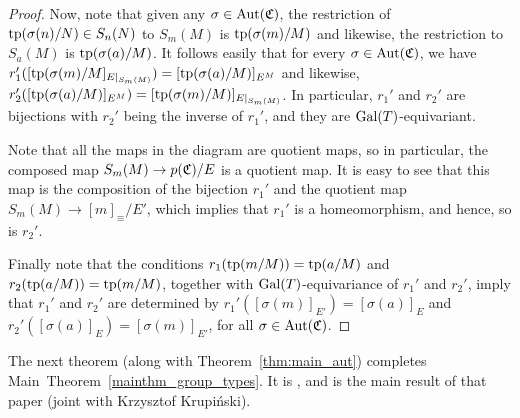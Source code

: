 \begin{proof}
		Now, note that given any $\sigma\in \operatorname{{Aut}}({\mathfrak C})$, the restriction of $\operatorname{{tp}}(\sigma(n)/N)\in S_n(N)$ to $S_m(M)$ is $\operatorname{{tp}}(\sigma(m)/M)$ and likewise, the restriction to $S_a(M)$ is $\operatorname{{tp}}(\sigma(a)/M)$. It follows easily that for every $\sigma\in \operatorname{{Aut}}({\mathfrak C})$, we have $r_1'([\operatorname{{tp}}(\sigma(m)/M]_{E|_{S_m(M)}})=[\operatorname{{tp}}(\sigma(a)/M)]_{E^M}$ and likewise, $r_2'([\operatorname{{tp}}(\sigma(a)/M)]_{E^M})=[\operatorname{{tp}}(\sigma(m)/M)]_{E|_{S_m(M)}}$. In particular, $r_1'$ and $r_2'$ are bijections with $r_2'$ being the inverse of $r_1'$, and they are $\operatorname{{Gal}}(T)$-equivariant.
		
		Note that all the maps in the diagram are quotient maps, so in particular, the composed map $S_m(M)\to p({\mathfrak C})/E$ is a quotient map. It is easy to see that this map is the composition of the bijection $r_1'$ and the quotient map $S_m(M)\to [m]_{\equiv}/E'$, which implies that $r_1'$ is a homeomorphism, and hence, so is $r_2'$.
		
		Finally note that the conditions $r_1(\operatorname{{tp}}(m/M))=\operatorname{{tp}}(a/M)$ and $r_2(\operatorname{{tp}}(a/M))=\operatorname{{tp}}(m/M)$, together with $\operatorname{{Gal}}(T)$-equivariance of $r_1'$ and $r_2'$, imply that $r_1'$ and $r_2'$ are determined by $r_1'([\sigma(m)]_{E'})=[\sigma(a)]_{E}$ and $r_2'([\sigma(a)]_{E})=[\sigma(m)]_{E'}$, for all $\sigma \in \operatorname{{Aut}}({\mathfrak C})$.
	\end{proof}
	The next theorem (along with Theorem~\ref{thm:main_aut}) completes Main~Theorem~\ref{mainthm_group_types}. It is \cite[Theorem 7.13]{KR18}, and is the main result of that paper (joint with Krzysztof Krupiński).
